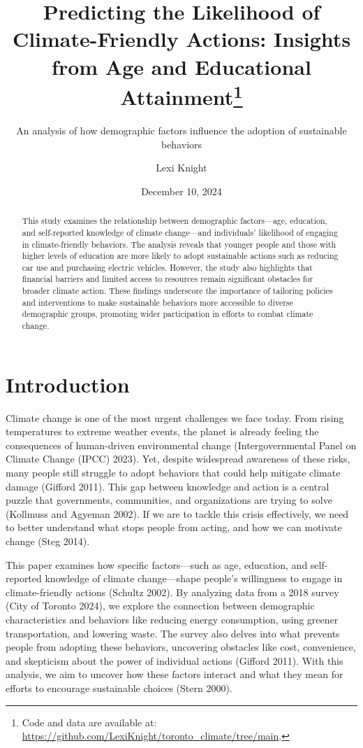 \documentclass[
  letterpaper,
  DIV=11,
  numbers=noendperiod]{scrartcl}
\title{Predicting the Likelihood of Climate-Friendly Actions: Insights
from Age and Educational Attainment\thanks{Code and data are available
at: \url{https://github.com/LexiKnight/toronto_climate/tree/main}.}}
\subtitle{An analysis of how demographic factors influence the adoption
of sustainable behaviors}
\author{Lexi Knight}
\date{December 10, 2024}
\renewcommand*\contentsname{Table of contents}
\newcommand\contentsname{Table of contents}
\begin{document}
\maketitle
\begin{abstract}
This study examines the relationship between demographic factors---age,
education, and self-reported knowledge of climate change---and
individuals' likelihood of engaging in climate-friendly behaviors. The
analysis reveals that younger people and those with higher levels of
education are more likely to adopt sustainable actions such as reducing
car use and purchasing electric vehicles. However, the study also
highlights that financial barriers and limited access to resources
remain significant obstacles for broader climate action. These findings
underscore the importance of tailoring policies and interventions to
make sustainable behaviors more accessible to diverse demographic
groups, promoting wider participation in efforts to combat climate
change.
\end{abstract}

\renewcommand*\contentsname{Table of contents}
{
\hypersetup{linkcolor=}
\setcounter{tocdepth}{3}
\tableofcontents
}
\section{Introduction}\label{introduction}

Climate change is one of the most urgent challenges we face today. From
rising temperatures to extreme weather events, the planet is already
feeling the consequences of human-driven environmental change
(Intergovernmental Panel on Climate Change (IPCC) 2023). Yet, despite
widespread awareness of these risks, many people still struggle to adopt
behaviors that could help mitigate climate damage (Gifford 2011). This
gap between knowledge and action is a central puzzle that governments,
communities, and organizations are trying to solve (Kollmuss and Agyeman
2002). If we are to tackle this crisis effectively, we need to better
understand what stops people from acting, and how we can motivate change
(Steg 2014).

This paper examines how specific factors---such as age, education, and
self-reported knowledge of climate change---shape people's willingness
to engage in climate-friendly actions (Schultz 2002). By analyzing data
from a 2018 survey (City of Toronto 2024), we explore the connection
between demographic characteristics and behaviors like reducing energy
consumption, using greener transportation, and lowering waste. The
survey also delves into what prevents people from adopting these
behaviors, uncovering obstacles like cost, convenience, and skepticism
about the power of individual actions (Gifford 2011). With this
analysis, we aim to uncover how these factors interact and what they
mean for efforts to encourage sustainable choices (Stern 2000).
\end{document}
